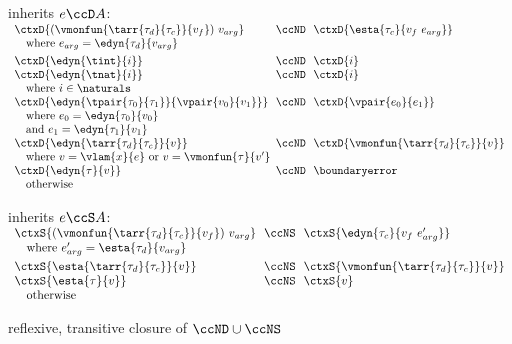 \begin{flushleft}
\medskip
\begin{minipage}[t]{\columnwidth}
 inherits $e \ccD A$:\\
$\begin{array}{l@{~~}c@{~~}l}
  \ctxD{(\vmonfun{\tarr{\tau_d}{\tau_c}}{v_f})~v_{arg}} & \ccND & \ctxD{\esta{\tau_c}{v_f~e_{arg}}}
\\ \multicolumn{3}{l}{\mbox{\quad where $e_{arg} = \edyn{\tau_d}{v_{arg}}$}}
\\[0.8ex]
  \ctxD{\edyn{\tint}{i}} & \ccND & \ctxD{i}
\\
  \ctxD{\edyn{\tnat}{i}} & \ccND & \ctxD{i}
\\ \multicolumn{3}{l}{\mbox{\quad where $i \in \naturals$}}
\\
  \ctxD{\edyn{\tpair{\tau_0}{\tau_1}}{\vpair{v_0}{v_1}}} & \ccND & \ctxD{\vpair{e_0}{e_1}}
\\ \multicolumn{3}{l}{\mbox{\quad where $e_0 = \edyn{\tau_0}{v_0}$}}
\\ \multicolumn{3}{l}{\mbox{\quad and $e_1 = \edyn{\tau_1}{v_1}$}}
\\
  \ctxD{\edyn{\tarr{\tau_d}{\tau_c}}{v}} & \ccND & \ctxD{\vmonfun{\tarr{\tau_d}{\tau_c}}{v}}
\\ \multicolumn{3}{l}{\mbox{\quad where $v = \vlam{x}{e}$ or $v = \vmonfun{\tau}{v'}$}}
\\
  \ctxD{\edyn{\tau}{v}} & \ccND & \boundaryerror
\\ \multicolumn{3}{l}{\mbox{\quad otherwise}}
\end{array}$
\end{minipage}%
\begin{minipage}[t]{\columnwidth}
 inherits $e \ccS A$:\\
$\begin{array}{l@{~~}c@{~~}l}
  \ctxS{(\vmonfun{\tarr{\tau_d}{\tau_c}}{v_f})~v_{arg}} & \ccNS & \ctxS{\edyn{\tau_c}{v_f~e_{arg}'}}
\\ \multicolumn{3}{l}{\mbox{\quad where $e_{arg}' = \esta{\tau_d}{v_{arg}}$}}
\\[0.8ex]
  \ctxS{\esta{\tarr{\tau_d}{\tau_c}}{v}} & \ccNS & \ctxS{\vmonfun{\tarr{\tau_d}{\tau_c}}{v}}
\\
  \ctxS{\esta{\tau}{v}} & \ccNS & \ctxS{v}
\\ \multicolumn{3}{l}{\mbox{\quad otherwise}}
\end{array}$

\vspace{6em}

 reflexive, transitive closure of $\ccND \cup \ccNS$
\end{minipage}


\end{flushleft}
